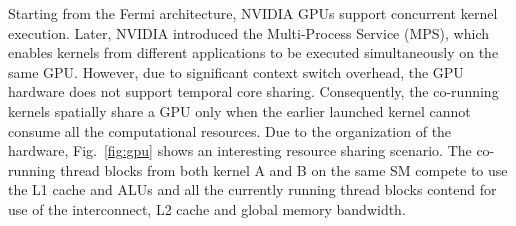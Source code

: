 Starting from the Fermi architecture, NVIDIA GPUs support concurrent kernel execution.  Later, NVIDIA introduced the Multi-Process Service (MPS), which enables kernels from  different applications to be executed simultaneously on the same GPU. However, due to significant context switch overhead,  the GPU hardware does not support temporal core sharing.  Consequently, the co-running kernels spatially share a GPU only  when the earlier launched kernel cannot consume all the computational resources. %
Due to the organization of the hardware, Fig.~\ref{fig:gpu}  shows an interesting resource sharing scenario. The co-running thread blocks  from both kernel A and B on the same SM compete to use the L1 cache and ALUs and all the currently running thread blocks contend for use of the interconnect, L2 cache and global memory bandwidth.
